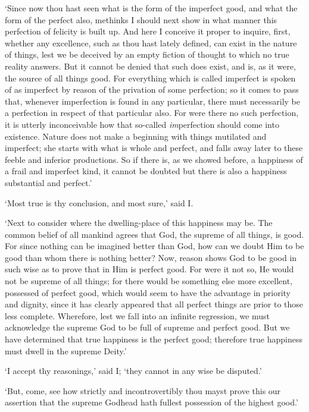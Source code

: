 \documentclass[11pt]{book}
\begin{document}
`Since now thou hast seen what is the form of the imperfect good, and
what the form of the perfect also, methinks I should next show in what
manner this perfection of felicity is built up. And here I conceive it
proper to inquire, first, whether any excellence, such as thou hast
lately defined, can exist in the nature of things, lest we be deceived
by an empty fiction of thought to which no true reality answers. But it
cannot be denied that such does exist, and is, as it were, the source of
all things good. For everything which is called imperfect is spoken of
as imperfect by reason of the privation of some perfection; so it comes
to pass that, whenever imperfection is found in any particular, there
must necessarily be a perfection in respect of that particular also. For
were there no such perfection, it is utterly inconceivable how that
so-called \emph{im}perfection should come into existence. Nature does not
make a beginning with things mutilated and imperfect; she starts with
what is whole and perfect, and falls away later to these feeble and
inferior productions. So if there is, as we showed before, a happiness
of a frail and imperfect kind, it cannot be doubted but there is also a
happiness substantial and perfect.'

`Most true is thy conclusion, and most sure,' said I.

`Next to consider where the dwelling-place of this happiness may be. The
common belief of all mankind agrees that God, the supreme of all things,
is good. For since nothing can be imagined better than God, how can we
doubt Him to be good than whom there is nothing better? Now, reason
shows God to be good in such wise as to prove that in Him is perfect
good. For were it not so, He would not be supreme of all things; for
there would be something else more excellent, possessed of perfect good,
which would seem to have the advantage in priority and dignity, since it
has clearly appeared that all perfect things are prior to those less
complete. Wherefore, lest we fall into an infinite regression, we must
acknowledge the supreme God to be full of supreme and perfect good. But
we have determined that true happiness is the perfect good; therefore
true happiness must dwell in the supreme Deity.'

`I accept thy reasonings,' said I; `they cannot in any wise be
disputed.'

`But, come, see how strictly and incontrovertibly thou mayst prove this
our assertion that the supreme Godhead hath fullest possession of the
highest good.'
\end{document}
